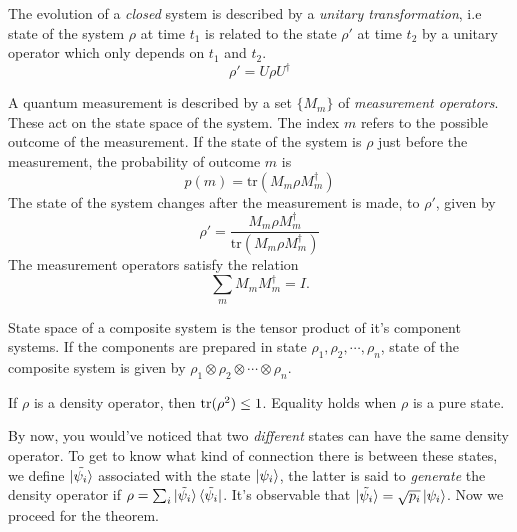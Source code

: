 \begin{postulate*}
    The evolution of a \textit{closed} system is described by a \textit{unitary transformation}, i.e state of the system $\rho$ at time $t_1$ is related to the state $\rho'$ at time $t_2$ by a unitary operator which only depends on $t_1$ and $t_2$.
    \begin{equation}
        \rho' = U\rho U^\dag
    \end{equation}
\end{postulate*}

\begin{postulate*}
    A quantum measurement is described by a set  $\{M_m\}$ of \textit{measurement operators}. These act on the state space of the system. The index $m$ refers to the possible outcome of the measurement. If the state of the system is $\rho$ just before the measurement, the probability of outcome $m$ is
    \begin{equation}
       p(m) = \text{tr}(M_m\rho M_m^\dag)
    \end{equation}
    The state of the system changes after the measurement is made, to $\rho'$, given by
    \begin{equation}
        \rho' = \frac{M_m\rho M_m^\dag}{\text{tr}(M_m\rho M_m^\dag)}
    \end{equation}
    The measurement operators satisfy the relation
    \begin{equation}
       \sum_m M_m M_m^\dag = I.
    \end{equation}
\end{postulate*}

\begin{postulate*}
    State space of a composite system is the tensor product of it's component systems. If the components are prepared in state $\rho_1, \rho_2, \cdots, \rho_n$, state of the composite system is given by $\rho_1\otimes \rho_2 \otimes \cdots \otimes \rho_n$.
\end{postulate*}

\begin{remark}
    If $\rho$ is a density operator, then $\text{tr}(\rho^2) \leq 1$. Equality holds when $\rho$ is a pure state.
\end{remark}

By now, you would've noticed that two \textit{different} states can have the same density operator. To get to know what kind of connection there is between these states, we define $\tilde{\ket{\psi_i}}$ associated with the state $\ket{\psi_i}$, the latter is said to \textit{generate} the density operator if $\rho = \sum_i \ket{\tilde{\psi_i}}\bra{\tilde{\psi_i}}$. It's observable that $\ket{\tilde{\psi_i}} = \sqrt{p_i}\ket{\psi_i}$. Now we proceed for the theorem.

